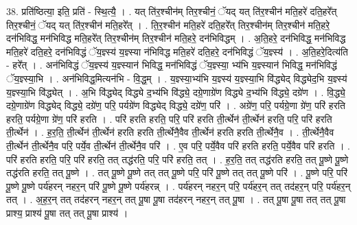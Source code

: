 \documentclass[17pt]{extarticle}
\begin{document}
38. प्रति॑ष्ठित्या॒ इति॒ प्रति॑ - स्थि॒त्यै॒ । . यत् ति॑र॒श्चीन॑म् तिर॒श्चीनं॒ ॅयद् यत् ति॑र॒श्चीन॑ मति॒हरे॑ दति॒हरे᳚त् तिर॒श्चीनं॒ ॅयद् यत् ति॑र॒श्चीन॑ मति॒हरे᳚त् । . ति॒र॒श्चीन॑ मति॒हरे॑ दति॒हरे᳚त् तिर॒श्चीन॑म् तिर॒श्चीन॑ मति॒हरे॒ दन॑भिविद्ध॒ मन॑भिविद्ध मति॒हरे᳚त् तिर॒श्चीन॑म् तिर॒श्चीन॑ मति॒हरे॒ दन॑भिविद्धम् । . अ॒ति॒हरे॒ दन॑भिविद्ध॒ मन॑भिविद्ध मति॒हरे॑ दति॒हरे॒ दन॑भिविद्धं ॅय॒ज्ञ्स्य॑ य॒ज्ञ्स्या न॑भिविद्ध मति॒हरे॑ दति॒हरे॒ दन॑भिविद्धं ॅय॒ज्ञ्स्य॑ । . अ॒ति॒हरे॒दित्य॑ति - हरे᳚त् । . अन॑भिविद्धं ॅय॒ज्ञ्स्य॑ य॒ज्ञ्स्यान॑ भिविद्ध॒ मन॑भिविद्धं ॅय॒ज्ञ्स्या॒ भ्य॑भि य॒ज्ञ्स्यान॑ भिविद्ध॒ मन॑भिविद्धं ॅय॒ज्ञ्स्या॒भि । . अन॑भिविद्ध॒मित्यन॑भि - वि॒द्ध॒म् । . य॒ज्ञ्स्या॒भ्य॑भि य॒ज्ञ्स्य॑ य॒ज्ञ्स्या॒भि वि॑द्ध्येद् विद्ध्येद॒भि य॒ज्ञ्स्य॑ य॒ज्ञ्स्या॒भि वि॑द्ध्येत् । . अ॒भि वि॑द्ध्येद् विद्ध्ये द॒भ्य॑भि वि॑द्ध्ये॒ दग्रे॒णाग्रे॑ण विद्ध्ये द॒भ्य॑भि वि॑द्ध्ये॒ दग्रे॑ण । . वि॒द्ध्ये॒ दग्रे॒णाग्रे॑ण विद्ध्येद् विद्ध्ये॒ दग्रे॑ण॒ परि॒ पर्यग्रे॑ण विद्ध्येद् विद्ध्ये॒ दग्रे॑ण॒ परि॑ । . अग्रे॑ण॒ परि॒ पर्यग्रे॒णा ग्रे॑ण॒ परि॑ हरति हरति॒ पर्यग्रे॒णा ग्रे॑ण॒ परि॑ हरति । . परि॑ हरति हरति॒ परि॒ परि॑ हरति ती॒र्त्थेन॑ ती॒र्त्थेन॑ हरति॒ परि॒ परि॑ हरति ती॒र्त्थेन॑ । . ह॒र॒ति॒ ती॒र्त्थेन॑ ती॒र्त्थेन॑ हरति हरति ती॒र्त्थेनै॒वैव ती॒र्त्थेन॑ हरति हरति ती॒र्त्थेनै॒व । . ती॒र्त्थेनै॒वैव ती॒र्त्थेन॑ ती॒र्त्थेनै॒व परि॒ पर्ये॒व ती॒र्त्थेन॑ ती॒र्त्थेनै॒व परि॑ । . ए॒व परि॒ पर्ये॒वैव परि॑ हरति हरति॒ पर्ये॒वैव परि॑ हरति । . परि॑ हरति हरति॒ परि॒ परि॑ हरति॒ तत् तद्ध॑रति॒ परि॒ परि॑ हरति॒ तत् । . ह॒र॒ति॒ तत् तद्ध॑रति हरति॒ तत् पू॒ष्णे पू॒ष्णे तद्ध॑रति हरति॒ तत् पू॒ष्णे । . तत् पू॒ष्णे पू॒ष्णे तत् तत् पू॒ष्णे परि॒ परि॑ पू॒ष्णे तत् तत् पू॒ष्णे परि॑ । . पू॒ष्णे परि॒ परि॑ पू॒ष्णे पू॒ष्णे पर्य॑हरन् नहर॒न् परि॑ पू॒ष्णे पू॒ष्णे पर्य॑हरन्न् । . पर्य॑हरन् नहर॒न् परि॒ पर्य॑हर॒न् तत् तद॑हर॒न् परि॒ पर्य॑हर॒न् तत् । . अ॒ह॒र॒न् तत् तद॑हरन् नहर॒न् तत् पू॒षा पू॒षा तद॑हरन् नहर॒न् तत् पू॒षा । . तत् पू॒षा पू॒षा तत् तत् पू॒षा प्राश्य॒ प्राश्य॑ पू॒षा तत् तत् पू॒षा प्राश्य॑ । \newline
\pagebreak
{}
\end{document}
